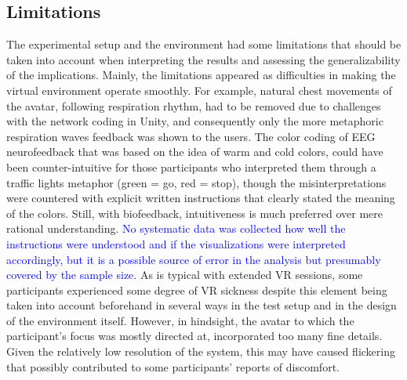 \documentclass[manuscript, review = false, screen]{acmart}
\begin{document}
\subsection{Limitations}
The experimental setup and the environment had some limitations that should be taken into account when interpreting the results and assessing the generalizability of the implications. Mainly, the limitations appeared as difficulties in making the virtual environment operate smoothly. For example, natural chest movements of the avatar, following respiration rhythm, had to be removed due to challenges with the network coding in Unity, and consequently only the more metaphoric respiration waves feedback was shown to the users. The color coding of EEG neurofeedback that was based on the idea of warm and cold colors, could have been counter-intuitive for those participants who interpreted them through a traffic lights metaphor (green = go, red = stop), though the misinterpretations were countered with explicit written instructions that clearly stated the meaning of the colors. Still, with biofeedback, intuitiveness is much preferred over mere rational understanding. \textcolor{blue}{No systematic data was collected how well the instructions were understood and if the visualizations were interpreted accordingly, but it is a possible source of error in the analysis but presumably covered by the sample size.} As is typical with extended VR sessions, some participants experienced some degree of VR sickness despite this element being taken into account beforehand in several ways in the test setup and in the design of the environment itself. However, in hindsight, the avatar to which the participant's focus was mostly directed at, incorporated too many fine details. Given the relatively low resolution of the system, this may have caused flickering that possibly contributed to some participants' reports of discomfort. 
\end{document}
